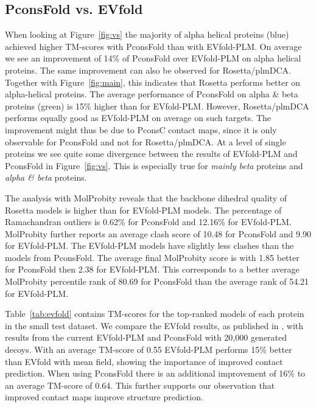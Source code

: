 \documentclass{bioinfo}
\begin{document}
\subsection{PconsFold vs. EVfold }

When looking at Figure~\ref{fig:vs} the majority of alpha helical
proteins (blue) achieved higher TM-scores with PconsFold than with
EVfold-PLM. On average we see an improvement of 14\% of PconsFold over
EVfold-PLM on alpha helical proteins. The same improvement can also be
observed for Rosetta/plmDCA. Together with Figure~\ref{fig:main},
this indicates that Rosetta performs better on alpha-helical
proteins. The average
performance of PconsFold on alpha \& beta proteins (green) is 15\%
higher than for EVfold-PLM. However, Rosetta/plmDCA performs equally good
as EVfold-PLM on average on such targets. The improvement might thus be
due to PconsC contact maps, since it is only observable for PconsFold
and not for Rosetta/plmDCA. At a level of single proteins we see quite
some divergence between the results of EVfold-PLM and PconsFold in
Figure~\ref{fig:vs}. This is especially true for {\em mainly beta}
proteins and {\em alpha \& beta} proteins.

The analysis with MolProbity reveals that the backbone dihedral
quality of Rosetta models is higher than for EVfold-PLM models. The
percentage of Ramachandran outliers is 0.62\% for PconsFold and
12.16\% for EVfold-PLM. MolProbity further reports an average clash
score of 10.48 for PconsFold and 9.90 for EVfold-PLM. The EVfold-PLM
models have slightly less clashes than the models from PconsFold. The
average final MolProbity score is with 1.85 better for PconsFold then
2.38 for EVfold-PLM. This corresponds to a better average MolProbity
percentile rank of 80.69 for PconsFold than the average rank of 54.21
for EVfold-PLM.


Table~\ref{tab:evfold} contains TM-scores for the top-ranked models of
each protein in the small test dataset. We compare the EVfold results,
as published in \citeauthor{marks_protein_2011}
\citeyear{marks_protein_2011}, with results from the current EVfold-PLM
and PconsFold with 20,000 generated decoys. With an average TM-score of 0.55
EVfold-PLM performs 15\% better than EVfold with mean field,
showing the importance of improved contact prediction. When using
PconsFold there is an additional improvement of 16\% to an average
TM-score of 0.64. This further supports our observation that improved
contact maps improve structure prediction.
\end{document}
